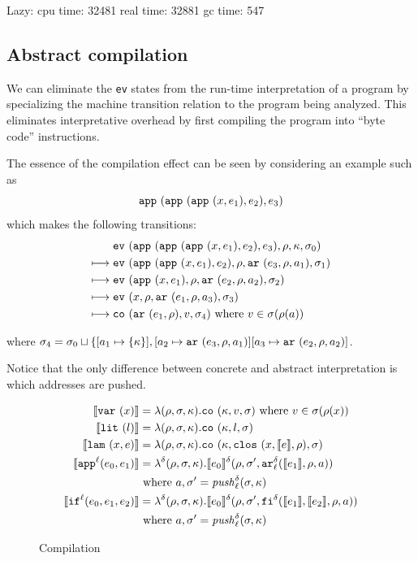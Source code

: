 \documentclass[preprint,onecolumn,9pt]{sigplanconf} %
\begin{document}
Lazy:
   cpu time: 32481 real time: 32881 gc time: 547

\subsection{Abstract compilation}

We can eliminate the {\tt ev} states from the run-time interpretation
of a program by specializing the machine transition relation to the
program being analyzed. This eliminates interpretative overhead by
first compiling the program into ``byte code'' instructions.

The essence of the compilation effect can be seen by considering an example
such as
\[
\sapp{\sapp{\sapp\mvar{\mexp_1}}{\mexp_2}}{\mexp_3}
\]
which makes the following transitions:
\begin{align}
& \ev{\sapp{\sapp{\sapp\mvar{\mexp_1}}{\mexp_2}}{\mexp_3},\menv,\mkont,\msto_0}\\
\machstep\; &
\ev{\sapp{\sapp\mvar{\mexp_1}}{\mexp_2},\menv,\kar{\mexp_3,\menv,\maddr_1},\msto_1}
\\
\machstep\; &
\ev{\sapp\mvar{\mexp_1},\menv,\kar{\mexp_2,\menv,\maddr_2},\msto_2}
\\
\machstep\; &
\ev{\mvar, \menv,\kar{\mexp_1,\menv,\maddr_3},\msto_3} %
\\
\machstep\; &
\co{\kar{\mexp_1,\menv},\mval,\msto_4} %
\mbox{ where } \mval \in \msto(\menv(\maddr))
\end{align}

where $\msto_4 = \msto_0 \sqcup \{ [\maddr_1 \mapsto \{ \mkont \}],
[\maddr_2 \mapsto \kar{\mexp_3,\menv,\maddr_1}]
[\maddr_3 \mapsto \kar{\mexp_2,\menv,\maddr_2}]$.

Notice that the only difference between concrete and abstract interpretation
is which addresses are pushed.

\begin{figure}
\begin{align*}
\compile{\svar\mvar} &= \lambda(\menv,\msto,\mkont) .\co{\mkont,\mval,\msto} \text{ where }\mval\in\msto(\menv(\mvar))
\\
\compile{\slit\mlit} &= \lambda(\menv,\msto,\mkont) .
\co{\mkont,\mlit,\msto}
\\
\compile{\slam\mvar\mexp} &= \lambda(\menv,\msto,\mkont) .
\co{\mkont,\clos{\mvar,\compile\mexp,\menv},\msto}
\\
\compile{\sapp[^\mlab]{\mexpi0}{\mexpi1}} &= \lambda^\mcntr(\menv,\msto,\mkont) .
\compile{\mexpi0}^\mcntr(\menv,\msto',\kar[_\mlab^\mcntr]{\compile{\mexpi1},\menv,\maddr})
\\
&
\text{ where }\maddr,\msto' = \mathit{push}^\mcntr_\mlab(\msto,\mkont)
\\
\compile{\sif[^\mlab]{\mexpi0}{\mexpi1}{\mexpi2}} &= \lambda^\mcntr(\menv,\msto,\mkont) .
\compile{\mexpi0}^\delta(\menv,\msto',\kif[^\mcntr]{\compile{\mexpi1},\compile{\mexpi2},\menv,\maddr})
\\
&\text{ where }\maddr,\msto' = \mathit{push}_\mlab^\mcntr(\msto,\mkont)
\end{align*}
\caption{Compilation}
\end{figure}
\end{document}
